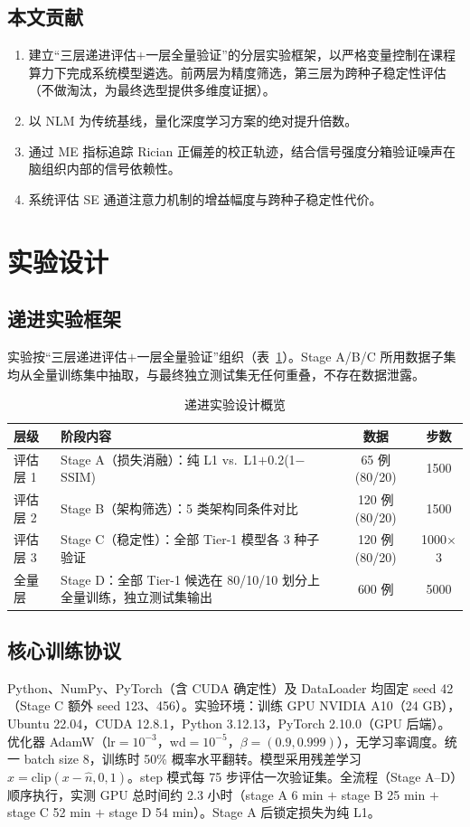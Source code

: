 \documentclass[UTF8,a4paper,12pt]{ctexart}
\begin{document}
\subsection{本文贡献}
\begin{enumerate}
  \item 建立``三层递进评估$+$一层全量验证''的分层实验框架，以严格变量控制在课程算力下完成系统模型遴选。前两层为精度筛选，第三层为跨种子稳定性评估（不做淘汰，为最终选型提供多维度证据）。
  \item 以 NLM 为传统基线，量化深度学习方案的绝对提升倍数。
  \item 通过 ME 指标追踪 Rician 正偏差的校正轨迹，结合信号强度分箱验证噪声在脑组织内部的信号依赖性。
  \item 系统评估 SE 通道注意力机制的增益幅度与跨种子稳定性代价。
\end{enumerate}

\section{实验设计}

\subsection{递进实验框架}
实验按``三层递进评估$+$一层全量验证''组织（表~\ref{tab:design}）。Stage A/B/C 所用数据子集均从全量训练集中抽取，与最终独立测试集无任何重叠，不存在数据泄露。

\begin{table}[htbp]
  \centering
  \caption{递进实验设计概览}
  \label{tab:design}
  \small
  \begin{tabularx}{\linewidth}{l X c c}
    \toprule
    层级 & 阶段内容 & 数据 & 步数 \\
    \midrule
    评估层 1 & Stage A（损失消融）：纯 L1 vs.\ L1$+$0.2(1$-$SSIM) & 65 例 (80/20) & 1500 \\
    评估层 2 & Stage B（架构筛选）：5 类架构同条件对比 & 120 例 (80/20) & 1500 \\
    评估层 3 & Stage C（稳定性）：全部 Tier-1 模型各 3 种子验证 & 120 例 (80/20) & 1000$\times$3 \\
    \midrule
    全量层 & Stage D：全部 Tier-1 候选在 80/10/10 划分上全量训练，独立测试集输出 & 600 例 & 5000 \\
    \bottomrule
  \end{tabularx}
\end{table}

\subsection{核心训练协议}
\label{sec:protocol}
Python、NumPy、PyTorch（含 CUDA 确定性）及 DataLoader 均固定 seed 42（Stage C 额外 seed 123、456）。实验环境：训练 GPU NVIDIA A10（24 GB），Ubuntu 22.04，CUDA 12.8.1，Python 3.12.13，PyTorch 2.10.0（GPU 后端）。优化器 AdamW（lr$=10^{-3}$，wd$=10^{-5}$，$\beta=(0.9,0.999)$），无学习率调度。统一 batch size 8，训练时 50\% 概率水平翻转。模型采用残差学习 $\hat{x} = \mathrm{clip}(x - \hat{n}, 0, 1)$。step 模式每 75 步评估一次验证集。全流程（Stage A--D）顺序执行，实测 GPU 总时间约 2.3 小时（stage A 6 min $+$ stage B 25 min $+$ stage C 52 min $+$ stage D 54 min）。Stage A 后锁定损失为纯 L1。
\end{document}
